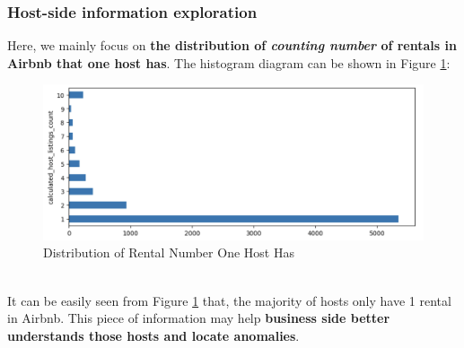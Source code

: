 \documentclass{article}
\begin{document}
	\subsubsection{Host-side information exploration}
	Here, we mainly focus on\textbf{ the distribution of \textit{counting number} of rentals in Airbnb that one host has}. The histogram diagram can be shown in Figure \ref{fig:004}:
	\begin{figure}[h]
		\centering
		\includegraphics[width=.45\textheight]{host_side.png}
		\caption{Distribution of Rental Number One Host Has}
		\label{fig:004}
	\end{figure}
	\\
	It can be easily seen from Figure \ref{fig:004} that, the majority of hosts only have 1 rental in Airbnb. This piece of information may help \textbf{business side better understands those hosts and locate anomalies}.
\end{document}
